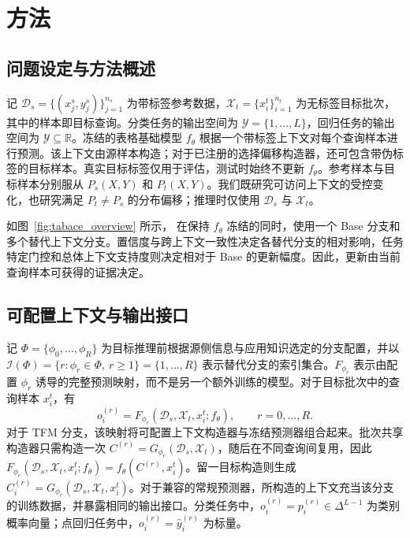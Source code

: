 \section{方法}
\label{sec:method}

\subsection{问题设定与方法概述}

记 $\mathcal D_s=\{(x_j^s,y_j^s)\}_{j=1}^{n_s}$ 为带标签参考数据，$\mathcal X_t=\{x_i^t\}_{i=1}^{n_t}$ 为无标签目标批次，其中的样本即目标查询。分类任务的输出空间为 $\mathcal Y=\{1,\ldots,L\}$，回归任务的输出空间为 $\mathcal Y\subseteq\mathbb R$。冻结的表格基础模型 $f_\theta$ 根据一个带标签上下文对每个查询样本进行预测。该上下文由源样本构造；对于已注册的选择偏移构造器，还可包含带伪标签的目标样本。真实目标标签仅用于评估，测试时始终不更新 $f_\theta$。参考样本与目标样本分别服从 $P_s(X,Y)$ 和 $P_t(X,Y)$。我们既研究可访问上下文的受控变化，也研究满足 $P_t\neq P_s$ 的分布偏移；推理时仅使用 $\mathcal D_s$ 与 $\mathcal X_t$。

如图~\ref{fig:tabace_overview} 所示，\method{} 在保持 $f_\theta$ 冻结的同时，使用一个 Base 分支和多个替代上下文分支。置信度与跨上下文一致性决定各替代分支的相对影响，任务特定门控和总体上下文支持度则决定相对于 Base 的更新幅度。因此，更新由当前查询样本可获得的证据决定。

\subsection{可配置上下文与输出接口}
\label{sec:context_interface}

记 $\Phi=\{\phi_0,\ldots,\phi_R\}$ 为目标推理前根据源侧信息与应用知识选定的分支配置，并以 $\mathcal I(\Phi)=\{r:\phi_r\in\Phi,\ r\geq1\}=\{1,\ldots,R\}$ 表示替代分支的索引集合。$F_{\phi_r}$ 表示由配置 $\phi_r$ 诱导的完整预测映射，而不是另一个额外训练的模型。对于目标批次中的查询样本 $x_i^t$，有
\begin{equation}
  o_i^{(r)}
  =F_{\phi_r}(\mathcal D_s,\mathcal X_t,x_i^t;f_\theta),
  \qquad r=0,\ldots,R.
  \label{eq:context_prediction}
\end{equation}
对于 TFM 分支，该映射将可配置上下文构造器与冻结预测器组合起来。批次共享构造器只需构造一次 $C^{(r)}=G_{\phi_r}(\mathcal D_s,\mathcal X_t)$，随后在不同查询间复用，因此
$F_{\phi_r}(\mathcal D_s,\mathcal X_t,x_i^t;f_\theta)=f_\theta(C^{(r)},x_i^t)$。留一目标构造则生成 $C_i^{(r)}=G_{\phi_r}(\mathcal D_s,\mathcal X_t,x_i^t)$。对于兼容的常规预测器，所构造的上下文充当该分支的训练数据，并暴露相同的输出接口。分类任务中，$o_i^{(r)}=p_i^{(r)}\in\Delta^{L-1}$ 为类别概率向量；点回归任务中，$o_i^{(r)}=\hat y_i^{(r)}$ 为标量。

